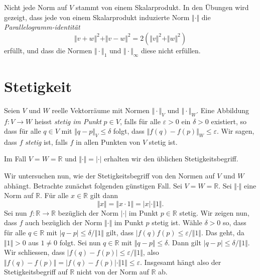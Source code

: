 \documentclass[../main.tex]{subfiles}
\begin{document}
\begin{remark}
  Nicht jede Norm auf $V$ stammt von einem Skalarprodukt.
  In den Übungen wird gezeigt, dass jede von einem Skalarprodukt
  induzierte Norm $\Vert \cdot \Vert$ die
  \emph{Parallelogramm-identität}
  \[
    \Vert v + w \Vert^2 + \Vert v - w \Vert^2 
    = 2(\Vert v \Vert^2 + \Vert w \Vert^2)
  \]
  erfüllt, und dass die Normen $\Vert \cdot \Vert_1$ 
  und $\Vert \cdot \Vert_{\infty}$ diese nicht erfüllen.
\end{remark}

\section{Stetigkeit}
\begin{definition}
  Seien $V$ und $W$ reelle Vektorräume mit Normen $\Vert \cdot \Vert_V$ 
  und
  $ \Vert \cdot \Vert_W$.
  Eine Abbildung $f \colon V \to W$ heisst \emph{stetig
  im Punkt} $p \in V$, falls für alle $\varepsilon > 0$ 
  ein $\delta > 0$ existiert, so dass für alle
  $q \in V$ mit $\Vert q - p \Vert_V \leq \delta$ 
  folgt, dass
  $\Vert f(q) - f(p) \Vert_W \leq \varepsilon$.
  Wir sagen, dass $f$ \emph{stetig} ist, falls
  $f$ in allen Punkten von $V$ stetig ist.
\end{definition}

\begin{example}
  Im Fall $V = W = \mathbb{R}$ und $\Vert \cdot \Vert = \vert \cdot \vert$ 
  erhalten wir den üblichen Stetigkeitsbegriff.
\end{example}

Wir untersuchen nun,
wie der Stetigkeitsbegriff von den Normen
auf  $V$ und $W$ abhängt.
Betrachte zunächst folgenden günstigen Fall.
Sei $V = W = \mathbb{R}$. Sei $\Vert \cdot \Vert$ 
eine Norm auf $\mathbb{R}$.
Für alle $x \in \mathbb{R}$ gilt dann
\[
  \Vert x \Vert = \Vert x \cdot 1 \Vert = |x| \cdot \Vert 1 \Vert.
\]
Sei nun $f \colon \mathbb{R} \to \mathbb{R}$
bezüglich der Norm $| \cdot |$ im Punkt $p \in \mathbb{R}$ stetig.
Wir zeigen nun, dass $f$ auch bezüglich der Norm $\Vert \cdot \Vert$ 
im Punkt $p$ stetig ist.
Wähle $\delta > 0$ so, dass für alle $q \in \mathbb{R}$ 
mit $|q - p| \leq \delta/\Vert 1 \Vert$ gilt,
dass $|f(q)  f(p) \leq \varepsilon/\Vert 1 \Vert$.
Das geht, da $\Vert 1 \Vert > 0$ aus $1 \neq 0$ folgt.
Sei nun $q \in \mathbb{R}$ mit $\Vert q - p \Vert \leq \delta$.
Dann gilt $|q - p| \leq \delta / \Vert 1 \Vert$.
Wir schliessen, dass $|f(q) - f(p)| \leq \varepsilon/\Vert 1 \Vert$,
also 
$\Vert f(q) - f(p) \Vert = |f(q) - f(p)| \cdot \Vert 1 \Vert \leq \varepsilon$.
Insgesamt hängt also der Stetigkeitsbegriff auf $\mathbb{R}$ nicht von
der Norm auf $\mathbb{R}$ ab.
\end{document}
